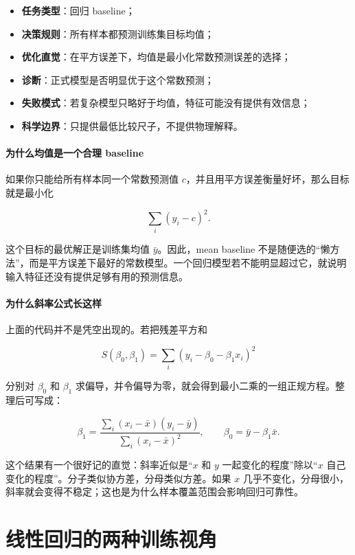 \begin{examplebox}
\begin{itemize}
    \item \textbf{任务类型}：回归 baseline；
    \item \textbf{决策规则}：所有样本都预测训练集目标均值；
    \item \textbf{优化直觉}：在平方误差下，均值是最小化常数预测误差的选择；
    \item \textbf{诊断}：正式模型是否明显优于这个常数预测；
    \item \textbf{失败模式}：若复杂模型只略好于均值，特征可能没有提供有效信息；
    \item \textbf{科学边界}：只提供最低比较尺子，不提供物理解释。
\end{itemize}
\end{examplebox}

\paragraph{为什么均值是一个合理 baseline}

如果你只能给所有样本同一个常数预测值 \(c\)，并且用平方误差衡量好坏，那么目标就是最小化

\[
\sum_i (y_i-c)^2.
\]

这个目标的最优解正是训练集均值 \(\bar{y}\)。因此，mean baseline 不是随便选的“懒方法”，而是平方误差下最好的常数模型。一个回归模型若不能明显超过它，就说明输入特征还没有提供足够有用的预测信息。

\paragraph{为什么斜率公式长这样}

上面的代码并不是凭空出现的。若把残差平方和

\[
S(\beta_0,\beta_1)=\sum_i (y_i-\beta_0-\beta_1 x_i)^2
\]

分别对 $\beta_0$ 和 $\beta_1$ 求偏导，并令偏导为零，就会得到最小二乘的一组正规方程。整理后可写成：

\[
\beta_1 =
\frac{\sum_i (x_i-\bar{x})(y_i-\bar{y})}
{\sum_i (x_i-\bar{x})^2},
\qquad
\beta_0 = \bar{y}-\beta_1\bar{x}.
\]

这个结果有一个很好记的直觉：斜率近似是“$x$ 和 $y$ 一起变化的程度”除以“$x$ 自己变化的程度”。分子类似协方差，分母类似方差。如果 $x$ 几乎不变化，分母很小，斜率就会变得不稳定；这也是为什么样本覆盖范围会影响回归可靠性。

\section{线性回归的两种训练视角}

